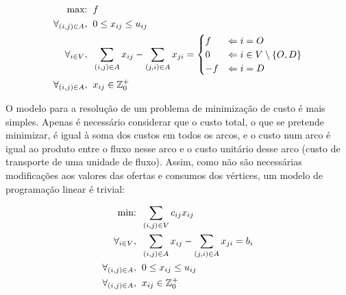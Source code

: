 \documentclass[12pt, a4paper, titlepage]{article}
\begin{document}
\begin{equation}
    \label{model-maximum-flow}
    \begin{split}
        \text{max:}             & \hspace{2mm} f \\
        \forall_{(i, j) \in A}, & \hspace{2mm} 0 \le x_{i j} \le u_{i j} \\
        \forall_{i \in V},      & \hspace{2mm}
            \sum_{(i, j) \in A} x_{i j} - \sum_{(j, i) \in A} x_{j i} =
            \begin{cases}
                f  & \Leftarrow i = O \\
                0  & \Leftarrow i \in V \setminus \{O, D\} \\
                -f & \Leftarrow i = D
            \end{cases} \\
        \forall_{(i, j) \in A}, & \hspace{2mm} x_{i j} \in \mathbb{Z}_0^+
    \end{split}
\end{equation}

O modelo para a resolução de um problema de minimização de custo é mais simples. Apenas é necessário
considerar que o custo total, o que se pretende minimizar, é igual à soma dos custos em todos os
arcos, e o custo num arco é igual ao produto entre o fluxo nesse arco e o custo unitário desse arco
(custo de transporte de uma unidade de fluxo). Assim, como não são necessárias modificações aos
valores das ofertas e consumos dos vértices, um modelo de programação linear é trivial:

\begin{equation}
    \label{model-minimum-cost}
    \begin{split}
        \text{min:}             & \hspace{2mm} \sum_{(i, j) \in V} c_{i j} x_{i j} \\
        \forall_{i \in V},      & \hspace{2mm}
            \sum_{(i, j) \in A} x_{i j} - \sum_{(j, i) \in A} x_{j i} = b_i \\
        \forall_{(i, j) \in A}, & \hspace{2mm} 0 \le x_{i j} \le u_{i j} \\
        \forall_{(i, j) \in A}, & \hspace{2mm} x_{i j} \in \mathbb{Z}_0^+
    \end{split}
\end{equation}
\end{document}
